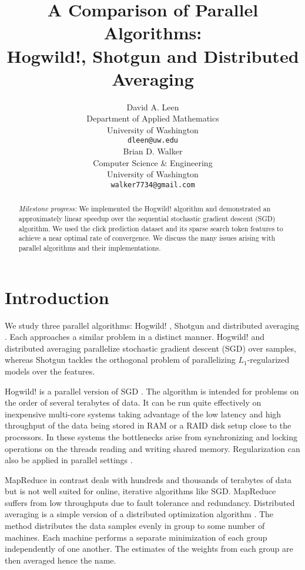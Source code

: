 \documentclass{article} %
\title{A Comparison of Parallel Algorithms:\\ {\Large Hogwild!, Shotgun and Distributed Averaging}}
\author{
David A. Leen \\
Department of Applied Mathematics\\
University of Washington \\
\texttt{dleen@uw.edu} \\
\And
Brian D. Walker \\
Computer Science \& Engineering \\
University of Washington \\
\texttt{walker7734@gmail.com} \\
}
\begin{document}
\maketitle

\begin{abstract}
{\em Milestone progress:} We implemented the Hogwild! algorithm and demonstrated an approximately linear speedup over the
sequential stochastic gradient descent (SGD) algorithm.  We used the click prediction dataset and its sparse search token features to achieve a near optimal rate of convergence. We discuss the many issues arising with parallel algorithms and their implementations.
\end{abstract}

\section{Introduction}
We study three parallel algorithms: Hogwild! \cite{niu2011hogwild}, Shotgun \cite{bradley2011parallel} and distributed averaging \cite{zhang2012comunication}. Each approaches a similar problem in a distinct manner. Hogwild! and distributed averaging parallelize stochastic gradient descent (SGD) over samples, whereas Shotgun tackles the orthogonal problem of parallelizing $L_1$-regularized models over the features.

Hogwild! is a parallel version of SGD \cite{niu2011hogwild, zinkevich2010parallelized}. The algorithm is intended for problems on the order of several terabytes of data. It can be run quite effectively on inexpensive multi-core systems taking advantage of the low latency and high throughput of the data being stored in RAM or a RAID disk setup close to the processors. In these systems the bottlenecks arise from synchronizing and locking operations on the threads reading and writing shared memory. Regularization can also be applied in parallel settings \cite{langford2009slow, agarwal2011distributed}.

MapReduce in contrast deals with hundreds and thousands of terabytes of data but is not well suited for online, iterative algorithms like SGD. MapReduce suffers from low throughputs due to fault tolerance and redundancy. Distributed averaging is a simple version of a distributed optimization algorithm \cite{dekel2012optimal, agarwal2011distributed}. The method distributes the data samples evenly in group to some number of machines. Each machine performs a separate minimization of each group independently of one another. The estimates of the weights from each group are then averaged hence the name.
\end{document}
